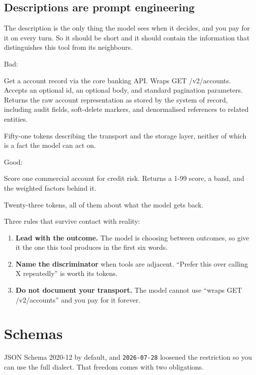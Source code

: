 \subsection{Descriptions are prompt engineering}

The description is the only thing the model sees when it decides, and you pay
for it on every turn. So it should be short and it should
contain the information that distinguishes this tool from its neighbours.

Bad:

\begin{plain}
Get a account record via the core banking API. Wraps GET /v2/accounts.
Accepts an optional id, an optional body, and standard pagination
parameters. Returns the raw account representation as stored by the
system of record, including audit fields, soft-delete markers, and
denormalised references to related entities.
\end{plain}

Fifty-one tokens describing the transport and the storage layer, neither of
which is a fact the model can act on.

Good:

\begin{plain}
Score one commercial account for credit risk. Returns a 1-99 score, a
band, and the weighted factors behind it.
\end{plain}

Twenty-three tokens, all of them about what the model gets back.

Three rules that survive contact with reality:

\begin{enumerate}[leftmargin=1.6em, itemsep=3pt]
\item \textbf{Lead with the outcome.} The model is choosing between outcomes,
so give it the one this tool produces in the first six words.
\item \textbf{Name the discriminator} when tools are adjacent. ``Prefer this
over calling X repeatedly'' is worth its tokens.
\item \textbf{Do not document your transport.} The model cannot use
``wraps GET /v2/accounts'' and you pay for it forever.
\end{enumerate}

\section{Schemas}

JSON Schema 2020-12 by default, and \texttt{2026-07-28} loosened the restriction
so you can use the full dialect. That freedom comes with two obligations.

